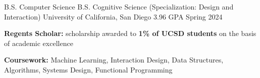 

\begin{cventries}

\cventrytwoalt
{B.S. Computer Science} %
{B.S. Cognitive Science (Specialization: Design and Interaction)} %
{University of California, San Diego} %
{3.96 GPA} %
{Spring 2024} %
{
  \begin{cvitems} %
    \item {\textbf{Regents Scholar:} scholarship awarded to \textbf{1\% of UCSD students} on the basis of academic excellence}
    \item {\textbf{Coursework:} Machine Learning, Interaction Design, Data Structures, Algorithms, Systems Design, Functional Programming}
  \end{cvitems}
}

\end{cventries}
